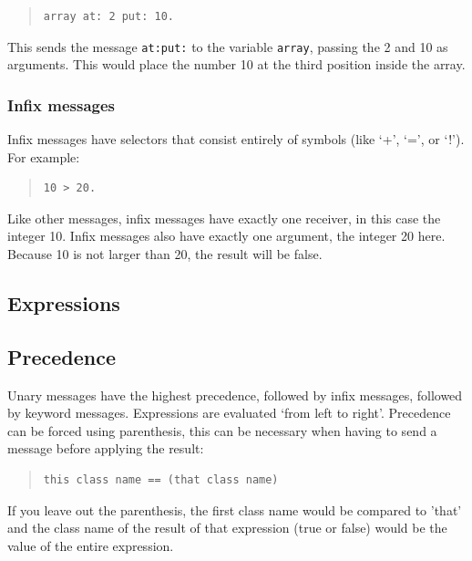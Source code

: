 \documentclass[a4paper]{article}
\begin{document}
\begin{quote}
\begin{lstlisting}
array at: 2 put: 10.
\end{lstlisting}
\end{quote}

This sends the message \texttt{at:put:} to the variable \texttt{array}, passing the 2 and 10 as arguments. This would place the number 10 at the third position inside the array.



\subsubsection{Infix messages}

Infix messages have selectors that consist entirely of symbols (like `+', `=', or `!'). For example:

\begin{quote}
\begin{lstlisting}
10 > 20.
\end{lstlisting}
\end{quote}

Like other messages, infix messages have exactly one receiver, in this case the integer 10.
Infix messages also have exactly one argument, the integer 20 here.
Because 10 is not larger than 20, the result will be false.

\subsection{Expressions}

\subsection{Precedence}

Unary messages have the highest precedence, followed by infix messages, followed by keyword messages. Expressions are evaluated `from left to right'. Precedence can be forced using parenthesis, this can be necessary when having to send a message before applying the result:
\begin{quote}
\begin{lstlisting}
this class name == (that class name)
\end{lstlisting}
\end{quote}
If you leave out the parenthesis, the first class name would be compared to 'that' and the class name of the result of that expression (true or false) would be the value of the entire expression.
\end{document}

